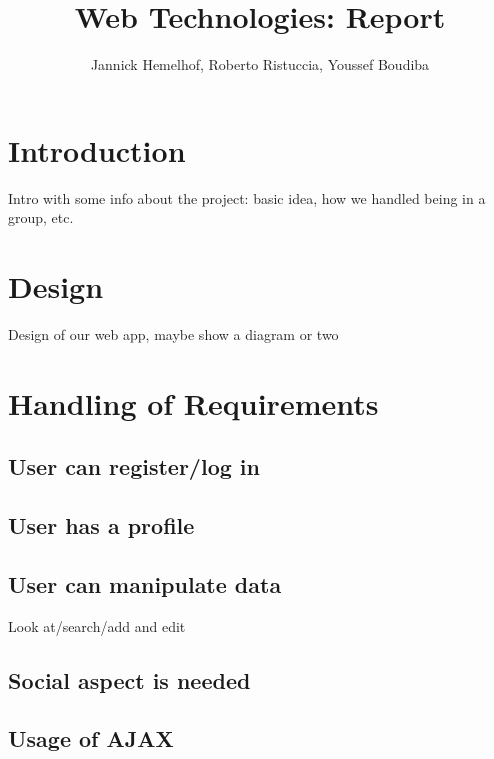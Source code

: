 \documentclass{article}
\title{Web Technologies: Report}
\author{Jannick Hemelhof, Roberto Ristuccia, Youssef Boudiba}
\begin{document}
\maketitle
\newpage
\tableofcontents
\newpage
{}

\section{Introduction}
Intro with some info about the project: basic idea, how we handled being in a group, etc.

\section{Design}
Design of our web app, maybe show a diagram or two

\section{Handling of Requirements}
\subsection{User can register/log in}

\subsection{User has a profile}

\subsection{User can manipulate data}
Look at/search/add and edit

\subsection{Social aspect is needed}

\subsection{Usage of AJAX}
\end{document}
